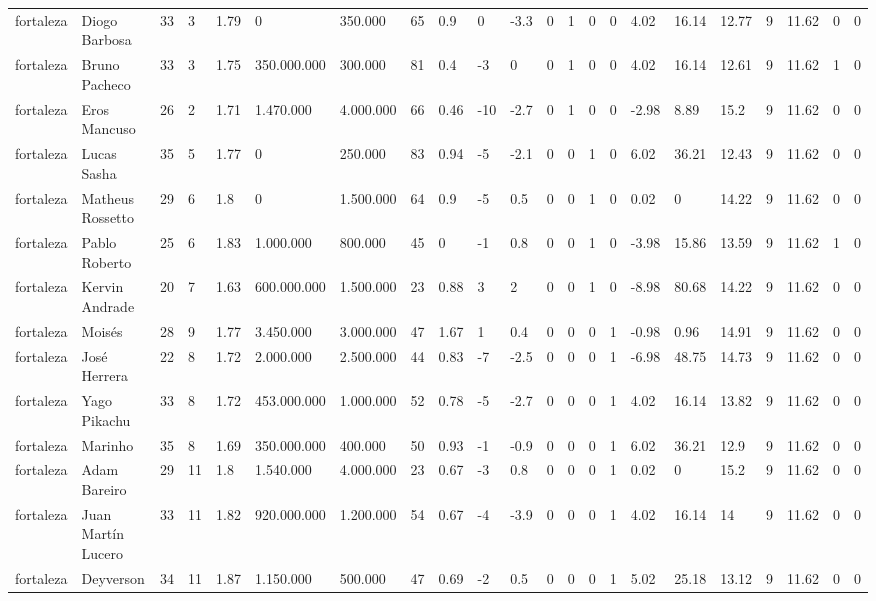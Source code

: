 \begin{longtable}{llllllllllllllllllllll}
fortaleza & Diogo Barbosa & 33 & 3 & 1.79 & 0 & 350.000 & 65 & 0.9 & 0 & -3.3 & 0 & 1 & 0 & 0 & 4.02 & 16.14 & 12.77 & 9 & 11.62 & 0 & 0 \\
fortaleza & Bruno Pacheco & 33 & 3 & 1.75 & 350.000.000 & 300.000 & 81 & 0.4 & -3 & 0 & 0 & 1 & 0 & 0 & 4.02 & 16.14 & 12.61 & 9 & 11.62 & 1 & 0 \\
fortaleza & Eros Mancuso & 26 & 2 & 1.71 & 1.470.000 & 4.000.000 & 66 & 0.46 & -10 & -2.7 & 0 & 1 & 0 & 0 & -2.98 & 8.89 & 15.2 & 9 & 11.62 & 0 & 0 \\
fortaleza & Lucas Sasha & 35 & 5 & 1.77 & 0 & 250.000 & 83 & 0.94 & -5 & -2.1 & 0 & 0 & 1 & 0 & 6.02 & 36.21 & 12.43 & 9 & 11.62 & 0 & 0 \\
fortaleza & Matheus Rossetto & 29 & 6 & 1.8 & 0 & 1.500.000 & 64 & 0.9 & -5 & 0.5 & 0 & 0 & 1 & 0 & 0.02 & 0 & 14.22 & 9 & 11.62 & 0 & 0 \\
fortaleza & Pablo Roberto & 25 & 6 & 1.83 & 1.000.000 & 800.000 & 45 & 0 & -1 & 0.8 & 0 & 0 & 1 & 0 & -3.98 & 15.86 & 13.59 & 9 & 11.62 & 1 & 0 \\
fortaleza & Kervin Andrade & 20 & 7 & 1.63 & 600.000.000 & 1.500.000 & 23 & 0.88 & 3 & 2 & 0 & 0 & 1 & 0 & -8.98 & 80.68 & 14.22 & 9 & 11.62 & 0 & 0 \\
fortaleza & Moisés & 28 & 9 & 1.77 & 3.450.000 & 3.000.000 & 47 & 1.67 & 1 & 0.4 & 0 & 0 & 0 & 1 & -0.98 & 0.96 & 14.91 & 9 & 11.62 & 0 & 0 \\
fortaleza & José Herrera & 22 & 8 & 1.72 & 2.000.000 & 2.500.000 & 44 & 0.83 & -7 & -2.5 & 0 & 0 & 0 & 1 & -6.98 & 48.75 & 14.73 & 9 & 11.62 & 0 & 0 \\
fortaleza & Yago Pikachu & 33 & 8 & 1.72 & 453.000.000 & 1.000.000 & 52 & 0.78 & -5 & -2.7 & 0 & 0 & 0 & 1 & 4.02 & 16.14 & 13.82 & 9 & 11.62 & 0 & 0 \\
fortaleza & Marinho & 35 & 8 & 1.69 & 350.000.000 & 400.000 & 50 & 0.93 & -1 & -0.9 & 0 & 0 & 0 & 1 & 6.02 & 36.21 & 12.9 & 9 & 11.62 & 0 & 0 \\
fortaleza & Adam Bareiro & 29 & 11 & 1.8 & 1.540.000 & 4.000.000 & 23 & 0.67 & -3 & 0.8 & 0 & 0 & 0 & 1 & 0.02 & 0 & 15.2 & 9 & 11.62 & 0 & 0 \\
fortaleza & Juan Martín Lucero & 33 & 11 & 1.82 & 920.000.000 & 1.200.000 & 54 & 0.67 & -4 & -3.9 & 0 & 0 & 0 & 1 & 4.02 & 16.14 & 14 & 9 & 11.62 & 0 & 0 \\
fortaleza & Deyverson & 34 & 11 & 1.87 & 1.150.000 & 500.000 & 47 & 0.69 & -2 & 0.5 & 0 & 0 & 0 & 1 & 5.02 & 25.18 & 13.12 & 9 & 11.62 & 0 & 0 \\

\end{longtable}
